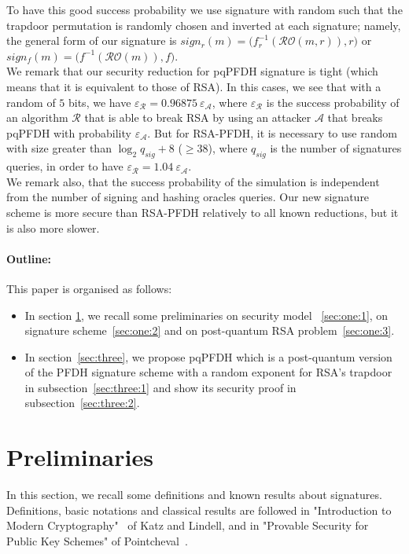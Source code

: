 \documentclass[a4paper,11pt]{article}
\begin{document}
To have this good success probability we use signature with random such that the trapdoor permutation is randomly chosen and inverted at each signature; namely, the general form of our signature is  $sign_{r}(m)=\big(f_{r}^{-1}(\mathcal{RO}(m, r)), r\big)$ or $sign_{f}(m)=\big(f^{-1}(\mathcal{RO}(m)), f\big)$.\\
We remark that our  security reduction for  pqPFDH signature is tight (which means that it is equivalent  to those of RSA). In this cases, we see that with a random of $5$ bits, we have $\varepsilon_{\mathcal{R}}=0.96875 \ \varepsilon_{\mathcal{A}}$, where $\varepsilon_{\mathcal{R}}$  is the success probability of an algorithm $\mathcal{R}$ that is able to break RSA by using an attacker $\mathcal{A}$ that breaks pqPFDH with probability $\varepsilon_{\mathcal{A}}$. But for RSA-PFDH, it is necessary to use  random with size greater than $\log_{2}q_{sig}+8$ ($\geq 38$), where $q_{sig}$ is the number of signatures queries, in order to have $\varepsilon_{\mathcal{R}}=1.04 \ \varepsilon_{\mathcal{A}}$.\\
We remark also, that the success  probability of the simulation is independent from the number of signing and hashing oracles queries. Our new signature scheme is more secure than RSA-PFDH relatively to all known reductions, but it is also more slower.

\paragraph{Outline:} This paper is organised as follows:
\begin{itemize}
\item In section \ref{sect:2}, we recall some preliminaries on security model ~\ref{sec:one:1}, on signature scheme~\ref{sec:one:2} and on post-quantum RSA problem~\ref{sec:one:3}.
\item In section~\ref{sec:three}, we propose pqPFDH which is a post-quantum version of the PFDH signature scheme with a random exponent for RSA's trapdoor in subsection~\ref{sec:three:1} and show its security proof in subsection~\ref{sec:three:2}.
\end{itemize}

\section{Preliminaries}\label{sect:2}
In this section, we recall some definitions and known results about signatures.
Definitions, basic notations and classical results are followed in "Introduction to Modern Cryptography"~\cite{Katz}
of Katz and Lindell, and  in "Provable Security for Public Key Schemes" of Pointcheval~\cite{Pointcheval}.
\end{document}
